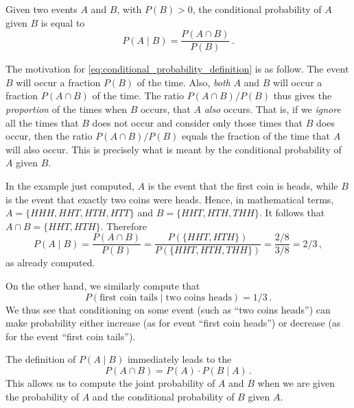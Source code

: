 \begin{definition}
    Given two events $A$ and $B$, with $P(B)>0$, the conditional probability of $A$ given $B$ is equal to
    \begin{equation}\label{eq:conditional_probability_definition}
        P(A\mid B) = \frac{P(A \cap B)}{P(B)}\,.
    \end{equation}
\end{definition}

The motivation for \autoref{eq:conditional_probability_definition} is as follow. The event $B$ will occur a fraction $P(B)$ of the time. Also, \emph{both} $A$ and $B$ will occur a fraction $P(A \cap B)$ of the time. The ratio $P(A \cap B) / P(B)$ thus gives the \emph{proportion} of the times when $B$ occurs, that $A$ \emph{also} occurs. That is, if we \emph{ignore} all the times that $B$ does not occur and consider only those times that $B$ does occur, then the ratio $P(A \cap B)/P(B)$ equals the fraction of the time that $A$ will also occur. This is precisely what is meant by the conditional probability of $A$ given $B$.

In the example just computed, $A$ is the event that the first coin is heads, while $B$ is the event that exactly two coins were heads. Hence, in mathematical terms, $A=\{HHH, HHT, HTH, HTT\}$ and $B=\{HHT, HTH, THH\}$. It follows that $A \cap B=\{HHT, HTH\}$. Therefore
$$
    P(A \mid B) = \frac{P(A\cap B)}{P(B)} = \frac{P(\{HHT, HTH\})}{P(\{HHT, HTH, THH\})} = \frac{2/8}{3/8}=2/3\,,
$$
as already computed.

On the other hand, we similarly compute that
$$
    P(\text{first coin tails} \mid \text{two coins heads}) =  1/3\,.
$$
We thus see that conditioning on some event (such as ``two coins heads'') can make probability either increase (as for event ``first coin heads'') or decrease (as for the event ``first coin tails'').

The definition of $P(A \mid B)$ immediately leads to the 
\begin{equation}
    \label{eq:152}
    P(A \cap B) = P(A)\cdot P(B \mid A)\,.
\end{equation}
This allows us to compute the joint probability of $A$ and $B$ when we are given the probability of $A$ and the conditional probability of $B$ given $A$.

